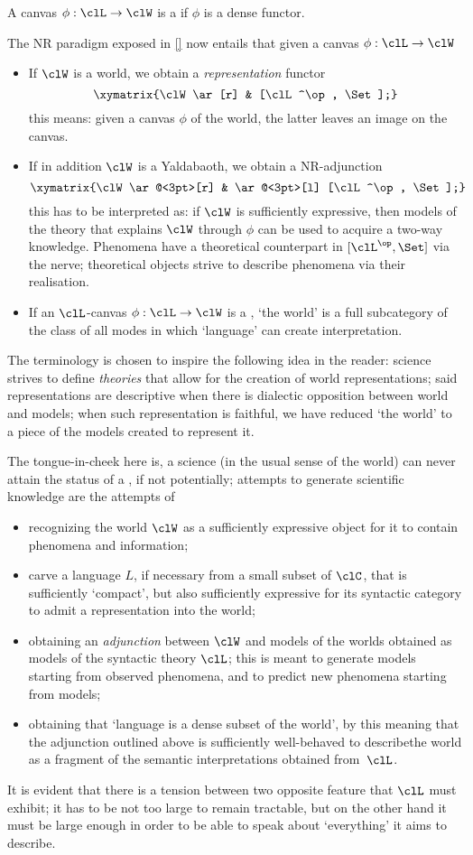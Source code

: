 \documentclass[a4paper]{../birkjour}
\begin{document}
A canvas $\phi : \clL \to \clW$ is a \emph{\science} if $\phi$ is a dense functor.
\begin{remark}
  The NR paradigm exposed in \autoref{} now entails that given a canvas $\phi : \clL \to \clW$
  \begin{itemize}
    \item If $\clW$ is a world, we obtain a \emph{representation} functor 
    \[ \xymatrix{\clW \ar[r] & [\clL^\op, \Set];} \]
    this means: given a canvas $\phi$ of the world, the latter leaves an image on the canvas.
    \item If in addition $\clW$ is a Yaldabaoth, we obtain a NR-adjunction
    \[\xymatrix{\clW \ar@<3pt>[r] & \ar@<3pt>[l] [\clL^\op, \Set];}\]
    this has to be interpreted as: if $\clW$ is sufficiently expressive, then models of the theory that explains $\clW$ through $\phi$ can be used to acquire a two-way knowledge. Phenomena have a theoretical counterpart in $[\clL^\op,\Set]$ via the nerve; theoretical objects strive to describe phenomena via their realisation.
    \item If an $\clL$-canvas $\phi : \clL \to \clW$ is a \science, `the world' is a full subcategory of the class of all modes in which `language' can create interpretation.
  \end{itemize}
\end{remark}
The terminology is chosen to inspire the following idea in the reader: science strives to define \emph{theories} that allow for the creation of world representations; said representations are descriptive when there is dialectic opposition between world and models; when such representation is faithful, we have reduced `the world' to a piece of the models created to represent it.

The tongue-in-cheek here is, a science (in the usual sense of the world) can never attain the status of a \science, if not potentially; attempts to generate scientific knowledge are the attempts of
\begin{itemize}
  \item recognizing the world $\clW$ as a sufficiently expressive object for it to contain phenomena and information;
  \item carve a language $L$, if necessary from a small subset of $\clC$, that is sufficiently `compact', but also sufficiently expressive for its syntactic category to admit a representation into the world;
  \item obtaining an \emph{adjunction} between $\clW$ and models of the worlds obtained as models of the syntactic theory $\clL$; this is meant to generate models starting from observed phenomena, and to predict new phenomena starting from models;
  \item obtaining that `language is a dense subset of the world', by this meaning that the adjunction outlined above is sufficiently well-behaved to describethe world as a fragment of the semantic interpretations obtained from~$\clL$.
\end{itemize}
It is evident that there is a tension between two opposite feature that $\clL$ must exhibit; it has to be not too large to remain tractable, but on the other hand it must be large enough in order to be able to speak about `everything' it aims to describe.
\end{document}
